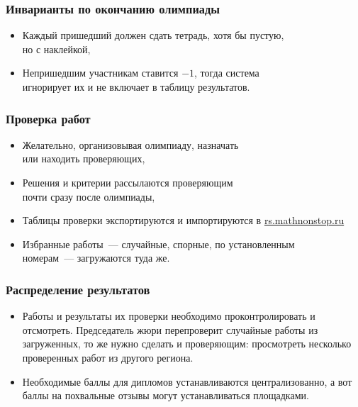 \documentclass[aspectratio=1610,12pt,notheorems]{beamer}
\begin{document}
\begin{frame} \frametitle{Инварианты по окончанию олимпиады}
\begin{itemize}
	\item Каждый пришедший должен сдать тетрадь, хотя бы пустую, \\
	но с наклейкой, \medskip
	\item Непришедшим участникам ставится $-1$, тогда система \\
	игнорирует их и не включает в таблицу результатов. \medskip
\end{itemize}
\end{frame}

\begin{frame} \frametitle{Проверка работ}
\begin{itemize}
	\item Желательно, организовывая олимпиаду, назначать \\ или находить проверяющих, \medskip
	\item Решения и критерии рассылаются проверяющим \\ почти сразу после олимпиады, \medskip
	\item Таблицы проверки экспортируются и импортируются в
	     \url{rs.mathnonstop.ru} \medskip
	\item Избранные работы~— случайные, спорные, по установленным \\ номерам~— загружаются туда же. \medskip
\end{itemize}
\end{frame}

\begin{frame} \frametitle{Распределение результатов}
\begin{itemize}
	\item Работы и результаты их проверки необходимо проконтролировать и отсмотреть. Председатель жюри перепроверит случайные работы из загруженных, то же нужно сделать и проверяющим: просмотреть несколько проверенных работ из другого региона. \bigskip
	\item Необходимые баллы для дипломов устанавливаются централизованно, а вот баллы на похвальные отзывы могут устанавливаться площадками.
\end{itemize}
\end{frame}

\def\fitem#1#2{\textcolor{hard}{\small (#1)}~~#2 \medskip \\}
\end{document}
